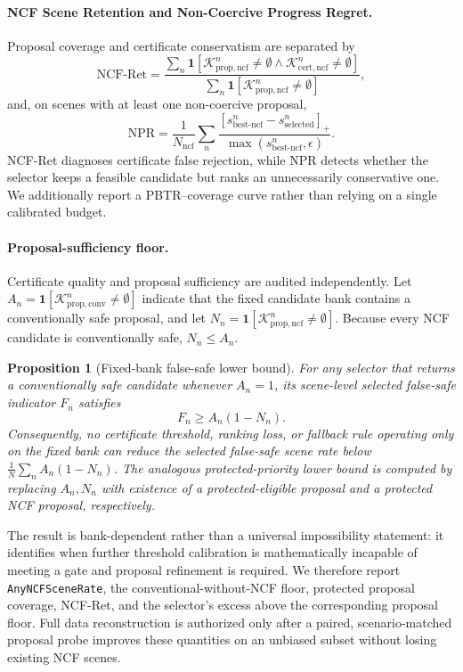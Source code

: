 \documentclass[10pt]{article}
\newcommand{\ind}{\mathbf{1}}
\newtheorem{proposition}{Proposition}
\begin{document}
\paragraph{NCF Scene Retention and Non-Coercive Progress Regret.}
Proposal coverage and certificate conservatism are separated by
\begin{equation}
    \mathrm{NCF\mbox{-}Ret}
    =
    \frac{
      \sum_n \mathbf 1[\mathcal K^n_{\mathrm{prop,ncf}}\neq\emptyset
      \wedge \mathcal K^n_{\mathrm{cert,ncf}}\neq\emptyset]
    }{
      \sum_n \mathbf 1[\mathcal K^n_{\mathrm{prop,ncf}}\neq\emptyset]
    },
\end{equation}
and, on scenes with at least one non-coercive proposal,
\begin{equation}
    \mathrm{NPR}
    =
    \frac{1}{N_{\mathrm{ncf}}}
    \sum_n
    \frac{[s^{n}_{\mathrm{best\mbox{-}ncf}}-s^{n}_{\mathrm{selected}}]_+}
         {\max(s^{n}_{\mathrm{best\mbox{-}ncf}},\epsilon)}.
\end{equation}
NCF-Ret diagnoses certificate false rejection, while NPR detects whether the selector keeps a feasible candidate but ranks an unnecessarily conservative one. We additionally report a PBTR--coverage curve rather than relying on a single calibrated budget.


\paragraph{Proposal-sufficiency floor.}
Certificate quality and proposal sufficiency are audited independently.  Let
$A_n=\ind[\mathcal K^n_{\mathrm{prop,conv}}\neq\emptyset]$ indicate that the
fixed candidate bank contains a conventionally safe proposal, and let
$N_n=\ind[\mathcal K^n_{\mathrm{prop,ncf}}\neq\emptyset]$.  Because every NCF
candidate is conventionally safe, $N_n\le A_n$.
\begin{proposition}[Fixed-bank false-safe lower bound]
\label{prop:proposal_floor}
For any selector that returns a conventionally safe candidate whenever
$A_n=1$, its scene-level selected false-safe indicator $F_n$ satisfies
\begin{equation}
    F_n \ge A_n(1-N_n).
\end{equation}
Consequently, no certificate threshold, ranking loss, or fallback rule operating
only on the fixed bank can reduce the selected false-safe scene rate below
$\frac{1}{N}\sum_n A_n(1-N_n)$.  The analogous protected-priority lower bound is
computed by replacing $A_n,N_n$ with existence of a protected-eligible proposal
and a protected NCF proposal, respectively.
\end{proposition}
The result is bank-dependent rather than a universal impossibility statement:
it identifies when further threshold calibration is mathematically incapable of
meeting a gate and proposal refinement is required.  We therefore report
\texttt{AnyNCFSceneRate}, the conventional-without-NCF floor, protected
proposal coverage, NCF-Ret, and the selector's excess above the corresponding
proposal floor.  Full data reconstruction is authorized only after a paired,
scenario-matched proposal probe improves these quantities on an unbiased subset
without losing existing NCF scenes.
\end{document}
